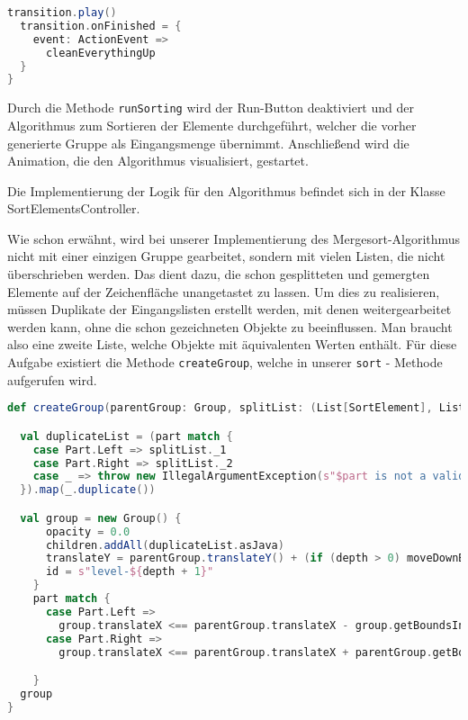 {\begin{lstlisting}[language=Scala]
  transition.play()
  transition.onFinished = {
    event: ActionEvent =>
      cleanEverythingUp
  }
}
\end{lstlisting}

Durch die Methode \texttt{runSorting} wird der Run-Button deaktiviert und der Algorithmus zum Sortieren der Elemente durchgeführt, welcher die vorher generierte Gruppe als Eingangsmenge übernimmt. Anschließend wird die Animation, die den Algorithmus visualisiert, gestartet.

Die Implementierung der Logik für den Algorithmus befindet sich in der Klasse SortElementsController.

Wie schon erwähnt, wird bei unserer Implementierung des Mergesort-Algorithmus nicht mit einer einzigen Gruppe gearbeitet, sondern mit vielen Listen, die nicht überschrieben werden. Das dient dazu, die schon gesplitteten und gemergten Elemente auf der Zeichenfläche unangetastet zu lassen. Um dies zu realisieren, müssen Duplikate der Eingangslisten erstellt werden, mit denen weitergearbeitet werden kann, ohne die schon gezeichneten Objekte zu beeinflussen. Man braucht also eine zweite Liste, welche Objekte mit äquivalenten Werten enthält. Für diese Aufgabe existiert die Methode \texttt{createGroup}, welche in unserer \texttt{sort} - Methode aufgerufen wird.

\begin{lstlisting}[language=Scala]
def createGroup(parentGroup: Group, splitList: (List[SortElement], List[SortElement]), part: EnumVal, depth: Int): Group = {

  val duplicateList = (part match {
    case Part.Left => splitList._1
    case Part.Right => splitList._2
    case _ => throw new IllegalArgumentException(s"$part is not a valid argument")
  }).map(_.duplicate())

  val group = new Group() {
      opacity = 0.0
      children.addAll(duplicateList.asJava)
      translateY = parentGroup.translateY() + (if (depth > 0) moveDownByPixel else 0)
      id = s"level-${depth + 1}"
    }
    part match {
      case Part.Left =>
        group.translateX <== parentGroup.translateX - group.getBoundsInParent.getWidth / 2 + SortElement.width / 2
      case Part.Right =>
        group.translateX <== parentGroup.translateX + parentGroup.getBoundsInParent.getWidth / 2 - group.getBoundsInParent.getWidth/2 - SortElement.width/2

    }
  group
}
\end{lstlisting}

}
